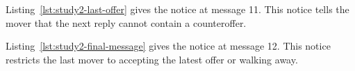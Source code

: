 Listing~\ref{lst:study2-last-offer} gives the notice at message 11. This notice tells the mover that the next reply cannot contain a counteroffer.


Listing~\ref{lst:study2-final-message} gives the notice at message 12. This notice restricts the last mover to accepting the latest offer or walking away.

